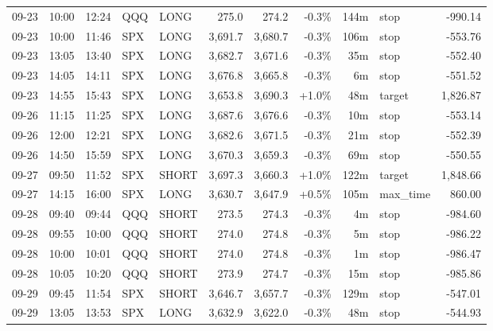 \documentclass[11pt,a4paper,twoside]{article}
\begin{document}
\begin{center}
\begin{longtable}{>{\color{txtmain}}l l l l l r r r r >{\color{txtmain}}l r}
09-23 & 10:00 & 12:24 & QQQ & LONG & 275.0 & 274.2 & \textcolor{lossred}{-0.3\%} & 144m & stop & \textcolor{lossred}{-990.14} \\
09-23 & 10:00 & 11:46 & SPX & LONG & 3,691.7 & 3,680.7 & \textcolor{lossred}{-0.3\%} & 106m & stop & \textcolor{lossred}{-553.76} \\
09-23 & 13:05 & 13:40 & SPX & LONG & 3,682.7 & 3,671.6 & \textcolor{lossred}{-0.3\%} & 35m & stop & \textcolor{lossred}{-552.40} \\
09-23 & 14:05 & 14:11 & SPX & LONG & 3,676.8 & 3,665.8 & \textcolor{lossred}{-0.3\%} & 6m & stop & \textcolor{lossred}{-551.52} \\
09-23 & 14:55 & 15:43 & SPX & LONG & 3,653.8 & 3,690.3 & \textcolor{wingreen}{+1.0\%} & 48m & target & \textcolor{wingreen}{1,826.87} \\
09-26 & 11:15 & 11:25 & SPX & LONG & 3,687.6 & 3,676.6 & \textcolor{lossred}{-0.3\%} & 10m & stop & \textcolor{lossred}{-553.14} \\
09-26 & 12:00 & 12:21 & SPX & LONG & 3,682.6 & 3,671.5 & \textcolor{lossred}{-0.3\%} & 21m & stop & \textcolor{lossred}{-552.39} \\
09-26 & 14:50 & 15:59 & SPX & LONG & 3,670.3 & 3,659.3 & \textcolor{lossred}{-0.3\%} & 69m & stop & \textcolor{lossred}{-550.55} \\
09-27 & 09:50 & 11:52 & SPX & SHORT & 3,697.3 & 3,660.3 & \textcolor{wingreen}{+1.0\%} & 122m & target & \textcolor{wingreen}{1,848.66} \\
09-27 & 14:15 & 16:00 & SPX & LONG & 3,630.7 & 3,647.9 & \textcolor{wingreen}{+0.5\%} & 105m & max\_time & \textcolor{wingreen}{860.00} \\
09-28 & 09:40 & 09:44 & QQQ & SHORT & 273.5 & 274.3 & \textcolor{lossred}{-0.3\%} & 4m & stop & \textcolor{lossred}{-984.60} \\
09-28 & 09:55 & 10:00 & QQQ & SHORT & 274.0 & 274.8 & \textcolor{lossred}{-0.3\%} & 5m & stop & \textcolor{lossred}{-986.22} \\
09-28 & 10:00 & 10:01 & QQQ & SHORT & 274.0 & 274.8 & \textcolor{lossred}{-0.3\%} & 1m & stop & \textcolor{lossred}{-986.47} \\
09-28 & 10:05 & 10:20 & QQQ & SHORT & 273.9 & 274.7 & \textcolor{lossred}{-0.3\%} & 15m & stop & \textcolor{lossred}{-985.86} \\
09-29 & 09:45 & 11:54 & SPX & SHORT & 3,646.7 & 3,657.7 & \textcolor{lossred}{-0.3\%} & 129m & stop & \textcolor{lossred}{-547.01} \\
09-29 & 13:05 & 13:53 & SPX & LONG & 3,632.9 & 3,622.0 & \textcolor{lossred}{-0.3\%} & 48m & stop & \textcolor{lossred}{-544.93} \\

\end{longtable}
\end{center}
\end{document}
